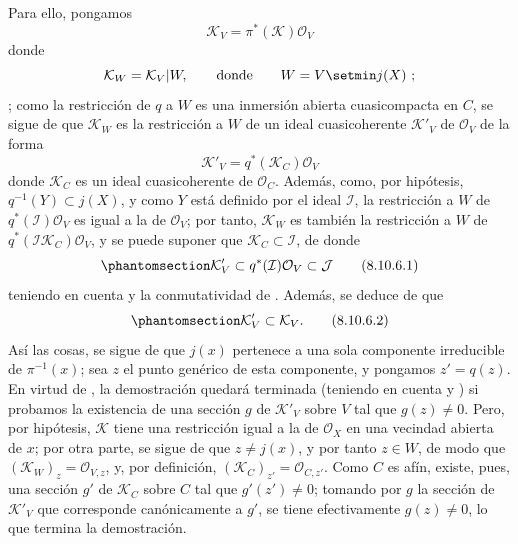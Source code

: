 \documentclass[oneside,10pt]{amsart}
\let\EGAOriginalLabel\label
\renewcommand{\label}[1]{\phantomsection\EGAOriginalLabel{#1}}
\begin{document}
\begin{env}[8.10.6]
Para ello, pongamos
\[
  \mathcal{K}_V=\pi^*(\mathcal{K})\mathcal{O}_V
\]
donde \[
  \mathcal{K}_W=\mathcal{K}_V|W,\qquad\hbox{donde}\qquad W=V\setmin j(X)~;
\];
como la restricción de $q$ a $W$ es una inmersión abierta cuasicompacta en $C$, se sigue de  que $\mathcal{K}_W$ es la restricción a $W$ de un ideal cuasicoherente $\mathcal{K}'_V$ de $\mathcal{O}_V$ de la forma
\[
  \mathcal{K}'_V=q^*(\mathcal{K}_C)\mathcal{O}_V
\]
donde $\mathcal{K}_C$ es un ideal cuasicoherente de $\mathcal{O}_C$.
Además, como, por hipótesis, $q^{-1}(Y)\subset j(X)$, y como $Y$ está definido por el ideal $\mathcal{I}$, la restricción a $W$ de $q^*(\mathcal{I})\mathcal{O}_V$ es igual a la de $\mathcal{O}_V$; por tanto, $\mathcal{K}_W$ es también la restricción a $W$ de $q^*(\mathcal{I}\mathcal{K}_C)\mathcal{O}_V$, y se puede suponer que $\mathcal{K}_C\subset\mathcal{I}$, de donde
\begin{equation}
\label{II.8.10.6.1-fr}
  \mathcal{K}'_V\subset q^*(\mathcal{I})\mathcal{O}_V\subset\mathcal{J}
\tag{8.10.6.1}
\end{equation}
teniendo en cuenta  y la conmutatividad de .
Además, se deduce de  que
\begin{equation}
\label{II.8.10.6.2-fr}
  \mathcal{K}'_V\subset\mathcal{K}_V.
\tag{8.10.6.2}
\end{equation}
Así las cosas, se sigue de  que $j(x)$ pertenece a una sola componente irreducible de $\pi^{-1}(x)$;
sea $z$ el punto genérico de esta componente, y pongamos $z'=q(z)$.
En virtud de , la demostración quedará terminada (teniendo en cuenta  y ) si probamos la existencia de una sección $g$ de $\mathcal{K}'_V$ sobre $V$ tal que $g(z)\neq0$.
Pero, por hipótesis, $\mathcal{K}$ tiene una restricción igual a la de $\mathcal{O}_X$ en una vecindad abierta de $x$;
por otra parte, se sigue de  que $z\neq j(x)$, y por tanto $z\in W$, de modo que $(\mathcal{K}_W)_z=\mathcal{O}_{V,z}$, y, por definición, $(\mathcal{K}_C)_{z'}=\mathcal{O}_{C,z'}$.
Como $C$ es afín, existe, pues, una sección $g'$ de $\mathcal{K}_C$ sobre $C$ tal que $g'(z')\neq0$; tomando por $g$ la sección de $\mathcal{K}'_V$ que corresponde canónicamente a $g'$, se tiene efectivamente $g(z)\neq0$, lo que termina la demostración.
\end{env}
\end{document}
